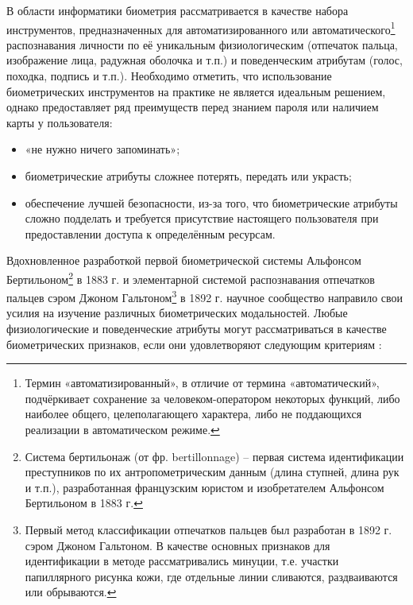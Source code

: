 \documentclass[12pt]{book}
\begin{document}
\large{В области информатики биометрия рассматривается в качестве набора инструментов, предназначенных для автоматизированного или автоматического\footnote{Термин «автоматизированный», в отличие от термина «автоматический», подчёркивает сохранение за человеком-оператором некоторых функций, либо наиболее общего, целеполагающего характера, либо не поддающихся реализации в автоматическом режиме.} распознавания личности по её уникальным физиологическим (отпечаток пальца, изображение лица, радужная оболочка и т.п.) и поведенческим атрибутам (голос, походка, подпись и т.п.). Необходимо отметить, что использование биометрических инструментов на практике не является идеальным решением, однако предоставляет ряд преимуществ перед знанием пароля или наличием карты у пользователя: 

\begin{itemize}[topsep=1pt] \itemsep0.1em
\item «не нужно ничего запоминать»;
\item биометрические атрибуты сложнее потерять, передать или украсть;
\item обеспечение лучшей безопасности, из-за того, что биометрические атрибуты сложно подделать и требуется присутствие настоящего пользователя при предоставлении доступа к определённым ресурсам.
\end{itemize}

Вдохновленное разработкой первой биометрической системы Альфонсом Бертильоном\footnote{Система бертильонаж (от фр. bertillonnage) -- первая система идентификации преступников по их антропометрическим данным (длина ступней, длина рук и т.п.), разработанная французским юристом и изобретателем Альфонсом Бертильоном в 1883 г.} в 1883 г. и элементарной системой распознавания отпечатков пальцев сэром Джоном Гальтоном\footnote{Первый метод классификации отпечатков пальцев был разработан в 1892 г. сэром Джоном Гальтоном. В качестве основных признаков для идентификации в методе рассматривались минуции, т.е. участки папиллярного рисунка кожи, где отдельные линии сливаются, раздваиваются или обрываются.} в 1892 г. научное сообщество направило свои усилия на изучение различных биометрических модальностей. Любые физиологические и поведенческие атрибуты могут рассматриваться в качестве биометрических признаков, если они удовлетворяют следующим критериям \cite{unar_2014}: 

}
\end{document}
